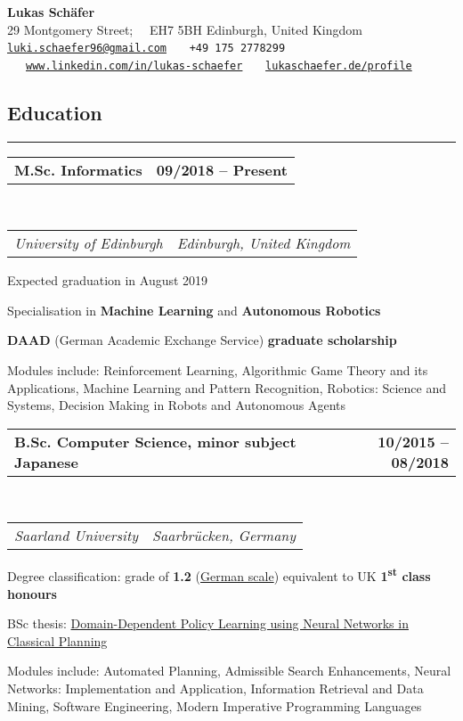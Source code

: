 \documentclass[10pt,letterpaper]{article}
\makeatletter
\newcommand{\headerrow}[2]
{\begin{tabular*}{\linewidth}{l@{\extracolsep{\fill}}r}
	#1 &
	#2 \\
\end{tabular*}}
\makeatother
\begin{document}
\begin{center}
{\Huge \textbf{Lukas Schäfer}}
\vspace{0.2cm}\\
29 Montgomery Street; \ \ EH7 5BH Edinburgh, United Kingdom
\\
{\texttt{\href{mailto:luki.schaefer96@gmail.com}{luki.schaefer96@gmail.com}} \ \textbullet \ \ \texttt{+49 175 2778299} \ \textbullet \ \ \texttt{\href{https://www.linkedin.com/in/lukas-schaefer}{www.linkedin.com/in/lukas-schaefer}}  \ \textbullet \ \ \texttt{\href{https://lukaschaefer.de/profile}{lukaschaefer.de/profile}}}
\end{center}

\subsection*{Education}
\hrule
\vspace{0.4em}

\noindent
\headerrow{\textbf{M.Sc. Informatics}}{\textbf{09/2018 -- Present}}
\\
\headerrow{\emph{University of Edinburgh}}{\emph{Edinburgh, United Kingdom}}
\vspace{-1.6em}
\begin{itemize*}
    \item Expected graduation in August 2019
    \item Specialisation in \textbf{Machine Learning} and \textbf{Autonomous Robotics}
    \item \textbf{DAAD} (German Academic Exchange Service) \textbf{graduate scholarship}
    \item Modules include: Reinforcement Learning, Algorithmic Game Theory and its Applications, Machine Learning and Pattern Recognition, Robotics: Science and Systems, Decision Making in Robots and Autonomous Agents
\end{itemize*}

\vspace{0.4em}

\noindent
\headerrow{\textbf{B.Sc. Computer Science, minor subject Japanese}}{\textbf{10/2015 -- 08/2018}}
\\
\headerrow{\emph{Saarland University}}{\emph{Saarbrücken, Germany}}
\vspace{-1.6em}
\begin{itemize*}
    \item Degree classification: grade of \textbf{1.2} (\href{https://en.wikipedia.org/wiki/Academic_grading_in_Germany}{German scale}) equivalent to UK \textbf{1\textsuperscript{st} class honours}
    \item BSc thesis: \href{https://www.lukaschaefer.de/assets/files/thesis.pdf}{Domain-Dependent Policy Learning using Neural Networks in Classical Planning}
    \item Modules include: Automated Planning, Admissible Search Enhancements, Neural Networks: Implementation and Application, Information Retrieval and Data Mining, Software Engineering, Modern Imperative Programming Languages
\end{itemize*}
\end{document}
